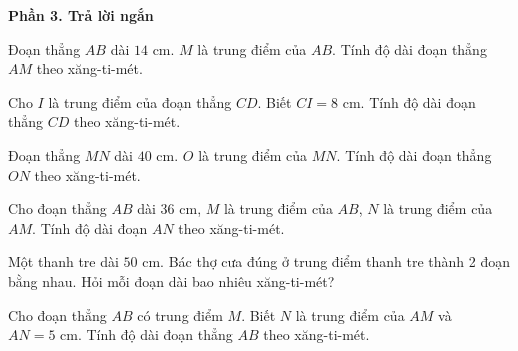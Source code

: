 \textbf{Phần 3. Trả lời ngắn}

\begin{ex} %
Đoạn thẳng $AB$ dài $14\text{ cm}$. $M$ là trung điểm của $AB$. Tính độ dài đoạn thẳng $AM$ theo xăng-ti-mét.
\end{ex}

\begin{ex} %
Cho $I$ là trung điểm của đoạn thẳng $CD$. Biết $CI = 8\text{ cm}$. Tính độ dài đoạn thẳng $CD$ theo xăng-ti-mét.
\end{ex}

\begin{ex} %
Đoạn thẳng $MN$ dài $40\text{ cm}$. $O$ là trung điểm của $MN$. Tính độ dài đoạn thẳng $ON$ theo xăng-ti-mét.
\end{ex}

\begin{ex} %
Cho đoạn thẳng $AB$ dài $36\text{ cm}$, $M$ là trung điểm của $AB$, $N$ là trung điểm của $AM$. Tính độ dài đoạn $AN$ theo xăng-ti-mét.
\end{ex}

\begin{ex} %
Một thanh tre dài $50\text{ cm}$. Bác thợ cưa đúng ở trung điểm thanh tre thành 2 đoạn bằng nhau. Hỏi mỗi đoạn dài bao nhiêu xăng-ti-mét?
\end{ex}

\begin{ex} %
Cho đoạn thẳng $AB$ có trung điểm $M$. Biết $N$ là trung điểm của $AM$ và $AN = 5\text{ cm}$. Tính độ dài đoạn thẳng $AB$ theo xăng-ti-mét.
\end{ex}

